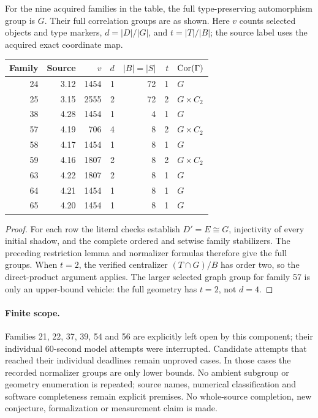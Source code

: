 \documentclass[11pt]{article}
\begin{document}
\begin{theorem}
For the nine acquired families in the table, the full type-preserving
automorphism group is $G$. Their full correlation groups are as shown.
Here $v$ counts selected objects and type markers, $d=|D|/|G|$,
and $t=|T|/|B|$; the source label uses the acquired exact coordinate map.
\end{theorem}
\begin{center}\small
\begin{tabular}{rrrrrrl}
\toprule
Family & Source & $v$ & $d$ & $|B|=|S|$ & $t$ & $\operatorname{Cor}(\Gamma)$\\
\midrule
24 & 3.12 & 1454 & 1 & 72 & 1 & $G$\\
25 & 3.15 & 2555 & 2 & 72 & 2 & $G\times C_2$\\
38 & 4.28 & 1454 & 1 & 4 & 1 & $G$\\
57 & 4.19 & 706 & 4 & 8 & 2 & $G\times C_2$\\
58 & 4.17 & 1454 & 1 & 8 & 1 & $G$\\
59 & 4.16 & 1807 & 2 & 8 & 2 & $G\times C_2$\\
63 & 4.22 & 1807 & 2 & 8 & 1 & $G$\\
64 & 4.21 & 1454 & 1 & 8 & 1 & $G$\\
65 & 4.20 & 1454 & 1 & 8 & 1 & $G$\\
\bottomrule
\end{tabular}\end{center}
\begin{proof}
For each row the literal checks establish $D'=E\cong G$, injectivity
of every initial shadow, and the complete ordered and setwise family
stabilizers. The preceding restriction lemma and normalizer formulas
therefore give the full groups. When $t=2$, the verified centralizer
$(T\cap G)/B$ has order two, so the direct-product argument applies.
The larger selected graph group for family 57 is only an upper-bound
vehicle: the full geometry has $t=2$, not $d=4$.
\end{proof}

\paragraph{Finite scope.}
Families 21, 22, 37, 39, 54 and 56 are explicitly left open by this
component; their individual 60-second model attempts were interrupted.
Candidate attempts that reached their individual deadlines remain
unproved cases. In those cases the recorded normalizer groups are
only lower bounds. No ambient subgroup or geometry enumeration is
repeated; source names, numerical classification and software
completeness remain explicit premises. No whole-source completion,
new conjecture, formalization or measurement claim is made.
\end{document}
